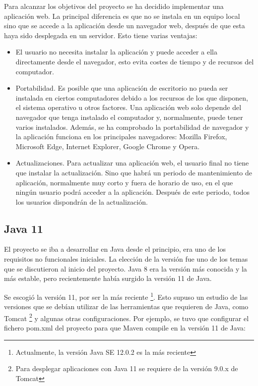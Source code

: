 Para alcanzar los objetivos del proyecto se ha decidido implementar una aplicación web. La principal diferencia es que no se instala en un equipo local sino que se accede a la aplicación desde un navegador web, después de que esta haya sido desplegada en un servidor. Esto tiene varias ventajas: 
\begin{itemize}
	\tightlist
	\item El usuario no necesita instalar la aplicación y puede acceder a ella directamente desde el navegador, esto evita costes de tiempo y de recursos del computador.
	\item  Portabilidad. Es posible que una aplicación de escritorio no pueda ser instalada en ciertos computadores debido a los recursos de los que disponen, el sistema operativo u otros factores. Una aplicación web solo depende del navegador que tenga instalado el computador y, normalmente, puede tener varios instalados. Además, se ha comprobado la portabilidad de navegador y la aplicación funciona en los principales navegadores: Mozilla Firefox, Microsoft Edge, Internet Explorer, Google Chrome y Opera.
	\item Actualizaciones. Para actualizar una aplicación web, el usuario final no tiene que instalar la actualización. Sino que habrá un periodo de mantenimiento de aplicación, normalmente muy corto y fuera de horario de uso, en el que ningún usuario podrá acceder a la aplicación. Después de este periodo, todos los usuarios dispondrán de la actualización.
\end{itemize}

\subsection{Java 11}

El proyecto se iba a desarrollar en Java desde el principio, era uno de los requisitos no funcionales iniciales. La elección de la versión fue uno de los temas que se discutieron al inicio del proyecto. Java 8 era la versión más conocida y la más estable, pero recientemente había surgido la versión 11 de Java. 

Se escogió la versión 11, por ser la más reciente \footnote{Actualmente, la versión Java SE 12.0.2 es la más reciente}. Esto supuso un estudio de las versiones que se debían utilizar de las herramientas que requieren de Java, como Tomcat \footnote{Para desplegar aplicaciones con Java 11 se requiere de la versión 9.0.x de Tomcat} y algunas otras configuraciones. Por ejemplo, se tuvo que configurar el fichero pom.xml del proyecto para que Maven compile en la versión 11 de Java:


